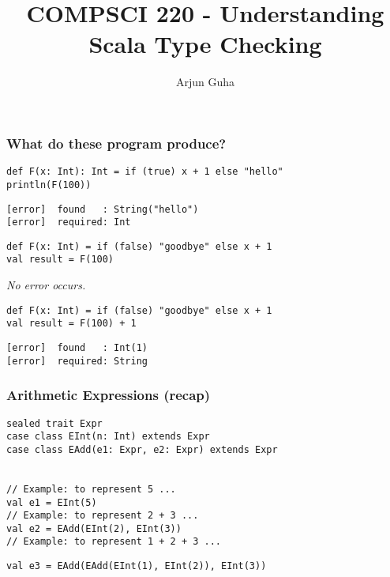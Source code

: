 \documentclass[8pt,pdf]{beamer}
\begin{document}

\title{COMPSCI 220 - Understanding Scala Type Checking}
\author{Arjun Guha}
\date{}

\begin{frame}
\titlepage
\end{frame}

\begin{frame}[fragile]
\frametitle{What do these program produce?}

\begin{block}{}
\begin{lstlisting}
def F(x: Int): Int = if (true) x + 1 else "hello"
println(F(100))
\end{lstlisting}
\end{block}

\pause

\begin{lstlisting}
[error]  found   : String("hello")
[error]  required: Int
\end{lstlisting}

\pause

\begin{block}{}
\begin{lstlisting}
def F(x: Int) = if (false) "goodbye" else x + 1
val result = F(100)
\end{lstlisting}
\end{block}

\emph{No error occurs.}

\pause

\begin{block}{}
\begin{lstlisting}
def F(x: Int) = if (false) "goodbye" else x + 1
val result = F(100) + 1
\end{lstlisting}
\end{block}

\pause

\begin{lstlisting}
[error]  found   : Int(1)
[error]  required: String
\end{lstlisting}

\end{frame}

\begin{frame}[fragile]
\frametitle{Arithmetic Expressions (recap)}

\begin{lstlisting}
sealed trait Expr
case class EInt(n: Int) extends Expr
case class EAdd(e1: Expr, e2: Expr) extends Expr


// Example: to represent 5 ...
val e1 = EInt(5)
// Example: to represent 2 + 3 ...
val e2 = EAdd(EInt(2), EInt(3))
// Example: to represent 1 + 2 + 3 ...
\end{lstlisting}
\pause
\begin{lstlisting}
val e3 = EAdd(EAdd(EInt(1), EInt(2)), EInt(3))
\end{lstlisting}

\end{frame}
\end{document}
